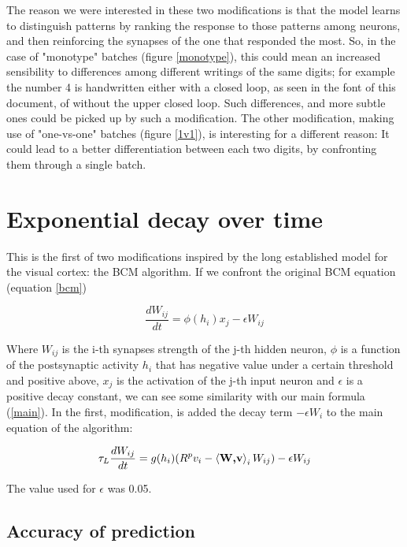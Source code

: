 \documentclass[a4paper]{report}
\begin{document}
The reason we were interested in these two modifications is that the model learns to distinguish patterns by ranking the response to those patterns among neurons, and then reinforcing the synapses of the one that responded the most.
So, in the case of "monotype" batches (figure \ref{monotype}), this could mean an increased sensibility to differences among different writings of the same digits;
for example the number 4 is handwritten either with a closed loop, as seen in the font of this document, of without the upper closed loop.
Such differences, and more subtle ones could be picked up by such a modification.
The other modification, making use of "one-vs-one" batches (figure \ref{1v1}), is interesting for a different reason:
It could lead to a better differentiation between each two digits, by confronting them through a single batch.

\section{Exponential decay over time}

This is the first of two modifications inspired by the long established model for the visual cortex:
the BCM algorithm.
If we confront the original BCM equation (equation \ref{bcm})

\begin{equation}
    \frac{dW_{ij}}{dt} = \phi(h_i)x_{j} - \epsilon W_{ij}
    \label{bcm}
\end{equation}

Where $W_{ij}$ is the i-th synapses strength of the j-th hidden neuron, $\phi$ is a function of the postsynaptic activity $h_i$ that has negative value under a certain threshold and positive above, $x_{j}$ is the activation of the j-th input neuron and $\epsilon$ is a positive decay constant, we can see some similarity with our main formula (\ref{main}).
In the first, modification, is added the decay term $-\epsilon W_i$ to the main equation of the algorithm:

\begin{equation}\label{099}
    \tau_L \frac{dW_{ij}}{dt} = g(h_i)(R^p v_i - \braket{\textbf{W,v}}_i W_{ij} ) -\epsilon W_{ij}
\end{equation}

The value used for $\epsilon$ was 0.05. 

\subsection{Accuracy of prediction}
\end{document}
